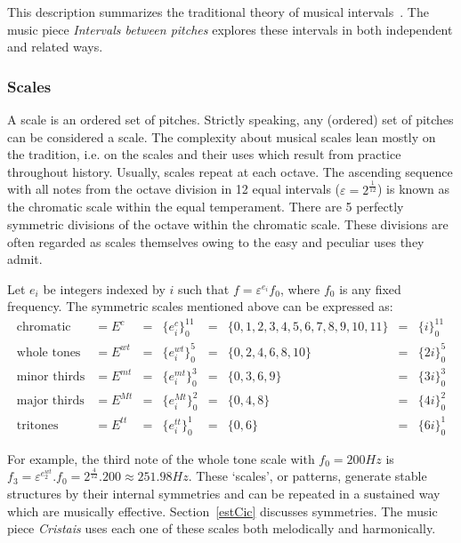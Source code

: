 This description summarizes the traditional theory of musical intervals~\cite{Lacerda}.
The music piece \emph{Intervals between pitches} explores these intervals in both independent and related ways.~\cite{MASSA}

\subsubsection{Scales}\label{subsec:escalas}
A scale is an ordered set of pitches. Strictly speaking, any (ordered) set of pitches can be considered a scale.
The complexity about musical scales lean mostly on the tradition, i.e. on the scales and their uses which result from practice throughout history. Usually, scales repeat at each octave. The ascending sequence with all notes from the octave division in 12 equal intervals ($\varepsilon=2^{\frac{1}{12}}$) is known as the chromatic scale within the equal temperament. There are 5 perfectly symmetric divisions of the octave within the chromatic scale. These divisions are often regarded as scales themselves owing to the easy and peculiar uses they admit.

Let $e_i$ be integers indexed by $i$ such that
$f=\varepsilon^{e_i} f_0$,
where $f_0$ is any fixed frequency.
The symmetric scales mentioned above can be expressed as:
\begin{equation}\label{escSim}
\begin{aligned}
	\text{chromatic}    & = E^c    & = & \{e_i^c\}_0^{11}   & = & \{0,1,2,3,4,5,6,7,8,9,10,11\} & = & \{i\}_0^{11}\\
	\text{whole tones}  & = E^{wt} & = & \{e_i^{wt}\}_0^{5} & = & \{0,2,4,6,8,10\}               & = & \{2i\}_0^{5} \\
	\text{minor thirds} & = E^{mt} & = & \{e_i^{mt}\}_0^{3} & = & \{0,3,6,9\}                    & = & \{3i\}_0^3 \\
	\text{major thirds} & = E^{Mt} & = & \{e_i^{Mt}\}_0^{2} & = & \{0,4,8\}                      & = & \{4i\}_0^2\\
	\text{tritones}     & = E^{tt} & = & \{e_i^{tt}\}_0^{1} & = & \{ 0, 6 \}                     & = & \{6i\}_0^1
\end{aligned}
\end{equation}

For example, the third note of the whole tone scale with $f_0=200Hz$ is $f_3=\varepsilon^{e_2^{wt}}. f_0 = 2^{\frac{4}{12}} . 200 \approx 251.98
Hz$. These `scales', or patterns, generate stable structures by their internal symmetries and can be repeated in a sustained way which are musically effective. Section~\ref{estCic} discusses symmetries.
The music piece \emph{Cristais} uses each one of these scales both melodically and harmonically.~\cite{MASSA}

